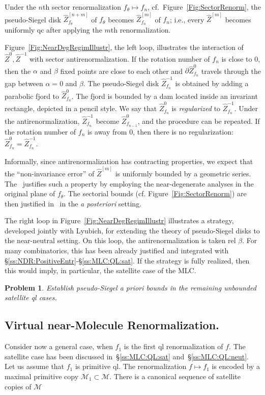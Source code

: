 \documentclass[twoside,leqno]{article}
\theoremstyle{plain}
\newtheorem{prob}[thm]{Problem}
\newcommand{\wZ}{{\widehat Z}}
\newcommand\MM{{\mathcal{M}}}
\begin{document}
Under the $n$th sector renormalization $f_\theta \mapsto f_n$, cf.~Figure~\ref{Fig:SectorRenorm}, the pseudo-Siegel disk $\wZ^{[n+m]}_{f_\theta}$ of $f_\theta$ becomes $\wZ^{[m]}_{f_n}$ of $f_n$; i.e., every $\wZ^{[m]}$ becomes uniformly qc after applying the $m$th renormalization. 


Figure~\ref{Fig:NearDegRegimIllustr}, the left loop, illustrates the interaction of $\wZ^{0},\wZ^{-1}$ with sector antirenormalization. If the rotation number of $f_n$ is close to $0$, then the $\alpha$ and $\beta$ fixed points are close to each other and $\partial \wZ^0_{f_n}$ travels through the gap between $\alpha= 0$ and $\beta$. The pseudo-Siegel disk $\wZ^{-1}_{f_n}$ is obtained by adding a parabolic fjord to $\wZ^0_{f_n}$. The fjord is bounded by a dam located inside an invariant rectangle, depicted in a pencil style. We say that $\wZ^{0}_{f_n}$ is \emph{regularized} to $\wZ^{-1}_{f_n}$. Under the antirenormalization,  $\wZ^{-1}_{f_n}$ become $\wZ^0_{f_{n-1}}$, and the procedure can be repeated. If the rotation number of $f_n$ is away from $0$, then there is no regularization: $\wZ^{0}_{f_n}=\wZ^{-1}_{f_n}$. 

Informally, since antirenormalization has contracting properties, we expect that the ``non-invariance error'' of $\wZ^{[m]}$ is uniformly bounded by a geometric series. The~\cite{DL_Uniform} justifies such a property by employing the near-degenerate analyses in the original plane of $f_\theta$. The sectorial bounds (cf. Figure~\ref{Fig:SectorRenorm}) are then justified in~\cite{DL:sector-bounds} in the \emph{a posteriori} setting. 


The right loop in Figure~\ref{Fig:NearDegRegimIllustr} illustrates a strategy, developed jointly with Lyubich, for extending the theory of pseudo-Siegel disks to the near-neutral setting. On this loop, the antirenormalization is taken rel $\beta$. For many combinatorics, this has been already justified and integrated with \S\ref{ss:NDR:PositiveEntr}-\S\ref{ss:MLC:QL:sat}. If the strategy is fully realized, then this would imply, in particular, the satellite case of the MLC.


\begin{prob}
\label{prob:Satel:unbounded}
Establish pseudo-Siegel a priori bounds in the remaining unbounded satellite ql cases.
\end{prob}

\subsection{Virtual near-Molecule Renormalization.}\label{ss:virtual_renorm} Consider now a general case, when $f_1$ is the first ql renormalization of $f$. The satellite case has been discussed in~\S\ref{ss:MLC:QL:sat} and~\S\ref{ss:MLC:QL:neut}. Let us assume that $f_1$ is primitive ql. The renormalization $f\mapsto f_1$ is encoded by a maximal primitive copy $\MM_1\subset \MM$. There is a canonical sequence of satellite copies of $\MM$
\end{document}
